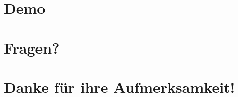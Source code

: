 \documentclass[11pt]{beamer}
\begin{document}
\section*{Demo}
\section*{Fragen?}
\section*{Danke für ihre Aufmerksamkeit!}



















\end{document}
